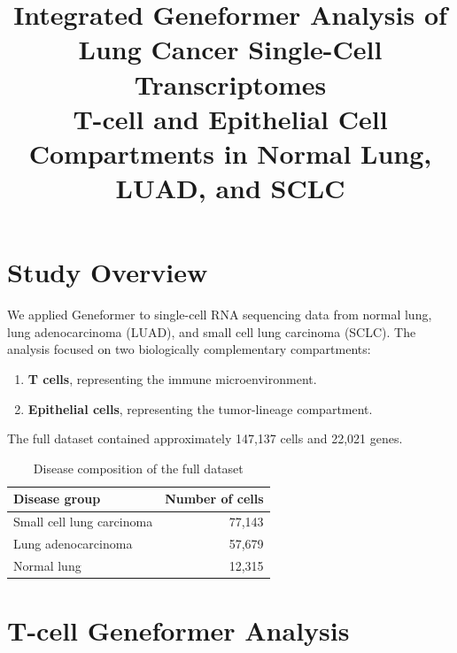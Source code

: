 \documentclass[11pt,a4paper]{article}
\title{\textbf{Integrated Geneformer Analysis of Lung Cancer Single-Cell Transcriptomes}\\
\large T-cell and Epithelial Cell Compartments in Normal Lung, LUAD, and SCLC}
\author{}
\date{}
\begin{document}
\maketitle

\begin{center}
\end{center}

\section{Study Overview}

We applied Geneformer to single-cell RNA sequencing data from normal lung, lung adenocarcinoma (LUAD), and small cell lung carcinoma (SCLC). The analysis focused on two biologically complementary compartments:

\begin{enumerate}[leftmargin=*]
    \item \textbf{T cells}, representing the immune microenvironment.
    \item \textbf{Epithelial cells}, representing the tumor-lineage compartment.
\end{enumerate}

The full dataset contained approximately 147,137 cells and 22,021 genes.

\begin{table}[htbp]
\centering
\caption{Disease composition of the full dataset}
\begin{tabular}{lr}
\toprule
Disease group & Number of cells \\
\midrule
Small cell lung carcinoma & 77,143 \\
Lung adenocarcinoma & 57,679 \\
Normal lung & 12,315 \\
\bottomrule
\end{tabular}
\end{table}

\section{T-cell Geneformer Analysis}
\end{document}
